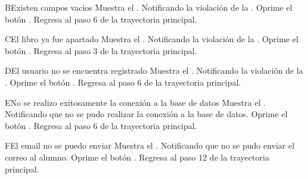 		\begin{UCtrayectoriaA}{B}{Existen campos vacios}
			\UCpaso[\UCsist] Muestra el . Notificando la violación de la .
			\UCpaso[\UCactor] Oprime el botón .
			\UCpaso[\UCsist] Regresa al paso 6 de la trayectoria principal.
		\end{UCtrayectoriaA}
		
		\begin{UCtrayectoriaA}{C}{El libro ya fue apartado}
			\UCpaso[\UCsist] Muestra el . Notificando la violación de la .
			\UCpaso[\UCactor] Oprime el botón .
			\UCpaso[\UCsist] Regresa al paso 3 de la trayectoria principal.
		\end{UCtrayectoriaA}
		
		\begin{UCtrayectoriaA}{D}{El usuario no se encuentra registrado}
			\UCpaso[\UCsist] Muestra el . Notificando la violación de la .
			\UCpaso[\UCactor] Oprime el botón .
			\UCpaso[\UCsist] Regresa al paso 6 de la trayectoria principal.
		\end{UCtrayectoriaA}
		
		
		\begin{UCtrayectoriaA}{E}{No se realizo exitosamente la conexión a la base de datos}
			\UCpaso[\UCsist] Muestra el . Notificando que no se pudo realizar la conexión a la base de datos.
			\UCpaso[\UCactor] Oprime el botón .
			\UCpaso[\UCsist] Regresa al paso 6 de la trayectoria principal.
		\end{UCtrayectoriaA}
		
		\begin{UCtrayectoriaA}{F}{El email no se puedo enviar}
			\UCpaso[\UCsist] Muestra el . Notificando que no se pudo enviar el correo al alumno.
			\UCpaso[\UCactor] Oprime el botón .
			\UCpaso[\UCsist] Regresa al paso 12 de la trayectoria principal.
		\end{UCtrayectoriaA}
		
